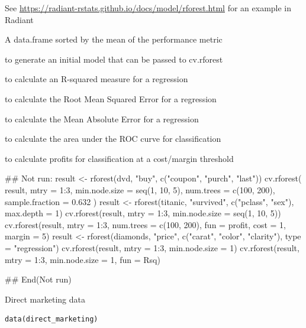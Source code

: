 \documentclass[a4paper]{book}
\begin{document}
%
\begin{Details}
See \url{https://radiant-rstats.github.io/docs/model/rforest.html} for an example in Radiant
\end{Details}
%
\begin{Value}
A data.frame sorted by the mean of the performance metric
\end{Value}
%
\begin{SeeAlso}
 to generate an initial model that can be passed to cv.rforest

 to calculate an R-squared measure for a regression

 to calculate the Root Mean Squared Error for a regression

 to calculate the Mean Absolute Error for a regression

 to calculate the area under the ROC curve for classification

 to calculate profits for classification at a cost/margin threshold
\end{SeeAlso}
%
\begin{Examples}
\begin{ExampleCode}
## Not run: 
result <- rforest(dvd, "buy", c("coupon", "purch", "last"))
cv.rforest(
  result,
  mtry = 1:3, min.node.size = seq(1, 10, 5),
  num.trees = c(100, 200), sample.fraction = 0.632
)
result <- rforest(titanic, "survived", c("pclass", "sex"), max.depth = 1)
cv.rforest(result, mtry = 1:3, min.node.size = seq(1, 10, 5))
cv.rforest(result, mtry = 1:3, num.trees = c(100, 200), fun = profit, cost = 1, margin = 5)
result <- rforest(diamonds, "price", c("carat", "color", "clarity"), type = "regression")
cv.rforest(result, mtry = 1:3, min.node.size = 1)
cv.rforest(result, mtry = 1:3, min.node.size = 1, fun = Rsq)

## End(Not run)

\end{ExampleCode}
\end{Examples}
%
\begin{Description}
Direct marketing data
\end{Description}
%
\begin{Usage}
\begin{verbatim}
data(direct_marketing)
\end{verbatim}
\end{Usage}
\end{document}
